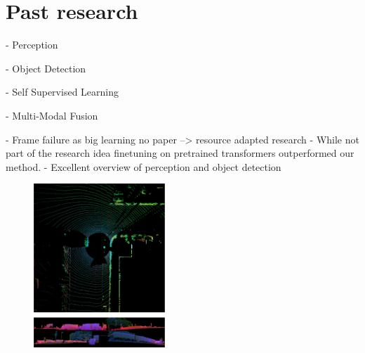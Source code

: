 \begin{minipage}[t]{504pt}
\begin{minipage}[t]{350pt}
\setlength{\parindent}{\myindent}
\setlength{\parskip}{\myparskip}

 \vspace*{-8pt}


 \section{Past research}
 - Perception

 - Object Detection

 - Self Supervised Learning

 - Multi-Modal Fusion

 - Frame failure as big learning no paper --> resource adapted research
 - While not part of the research idea finetuning on pretrained transformers outperformed our method.
 - Excellent overview of perception and object detection
 
\vspace*{-6pt}

\end{minipage}
\hspace{13pt}\begin{minipage}[t]{140pt}
\begin{figure}[H]
\includegraphics[width=140pt]{pic/fusion.png}
\end{figure}
\end{minipage}
\end{minipage}

